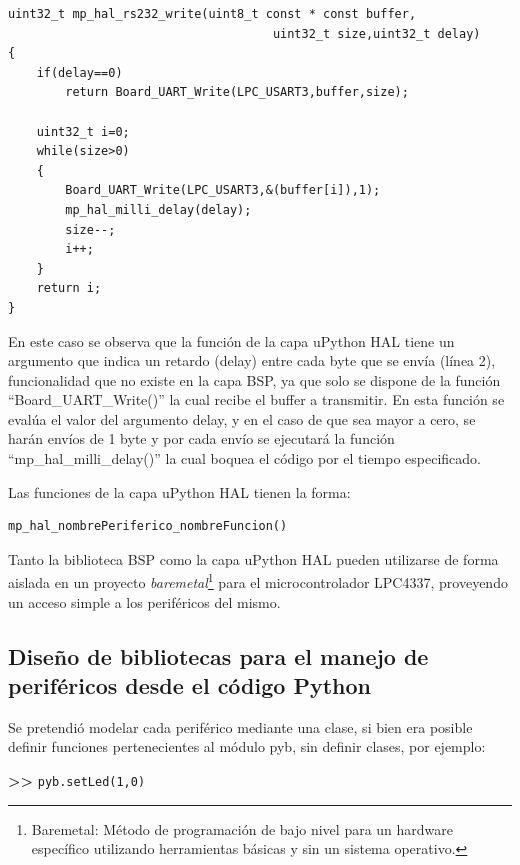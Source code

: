 \begin{lstlisting}[label={lst:uarthal},caption=Función de envío por la UART de la capa uPython HAL] 
uint32_t mp_hal_rs232_write(uint8_t const * const buffer, 
                                     uint32_t size,uint32_t delay)
{
    if(delay==0)
        return Board_UART_Write(LPC_USART3,buffer,size);

    uint32_t i=0;
    while(size>0)
    {
        Board_UART_Write(LPC_USART3,&(buffer[i]),1);
        mp_hal_milli_delay(delay);
        size--;
        i++;
    }
    return i;
}
\end{lstlisting}

En este caso se observa que la función de la capa uPython HAL tiene un argumento que indica un retardo (delay) entre cada byte que se envía (línea 2), funcionalidad que no existe en la capa BSP, ya que solo se dispone de la función “Board\_UART\_Write()” la cual recibe el buffer a transmitir.
En esta función se evalúa el valor del argumento delay, y en el caso de que sea mayor a cero, se harán envíos de 1 byte y por cada envío se ejecutará la función “mp\_hal\_milli\_delay()” la cual boquea el código por el tiempo especificado.

Las funciones de la capa uPython HAL tienen la forma:

\begin{verbatim}
mp_hal_nombrePeriferico_nombreFuncion()
\end{verbatim}

Tanto la biblioteca BSP como la capa uPython HAL pueden utilizarse de forma aislada en un proyecto \textit{baremetal}\footnote{Baremetal: Método de programación de bajo nivel para un hardware específico utilizando herramientas básicas y sin un sistema operativo.} para el microcontrolador LPC4337, proveyendo un acceso simple a los periféricos del mismo.


\subsection{Diseño de bibliotecas para el manejo de periféricos desde el código Python}

Se pretendió modelar cada periférico mediante una clase, si bien era posible definir funciones pertenecientes al módulo pyb, sin definir clases, por ejemplo:

\textbf{{\fontsize{16}{16}\selectfont \textgreater\textgreater}} \texttt{pyb.setLed(1,0)}

